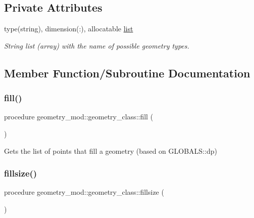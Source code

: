 \subsection*{Private Attributes}
\begin{DoxyCompactItemize}
\item 
type(string), dimension(\+:), allocatable \hyperlink{structgeometry__mod_1_1geometry__class_a218ff308d9bb94f4386573d7329babc6}{list}
\begin{DoxyCompactList}\small\item\em String list (array) with the name of possible geometry types. \end{DoxyCompactList}\end{DoxyCompactItemize}


\subsection{Member Function/\+Subroutine Documentation}
\mbox{\label{structgeometry__mod_1_1geometry__class_a0afee5607f0e2443a862741e40794368}} 
\subsubsection{\texorpdfstring{fill()}{fill()}}
{\footnotesize\ttfamily procedure geometry\+\_\+mod\+::geometry\+\_\+class\+::fill (\begin{DoxyParamCaption}{ }\end{DoxyParamCaption})\hspace{0.3cm}{\ttfamily [private]}}



Gets the list of points that fill a geometry (based on G\+L\+O\+B\+A\+L\+S\+::dp) 

\mbox{\label{structgeometry__mod_1_1geometry__class_a75f5a37d0b38c8baf66ee5089ea44d7a}} 
\subsubsection{\texorpdfstring{fillsize()}{fillsize()}}
{\footnotesize\ttfamily procedure geometry\+\_\+mod\+::geometry\+\_\+class\+::fillsize (\begin{DoxyParamCaption}{ }\end{DoxyParamCaption})\hspace{0.3cm}{\ttfamily [private]}}



